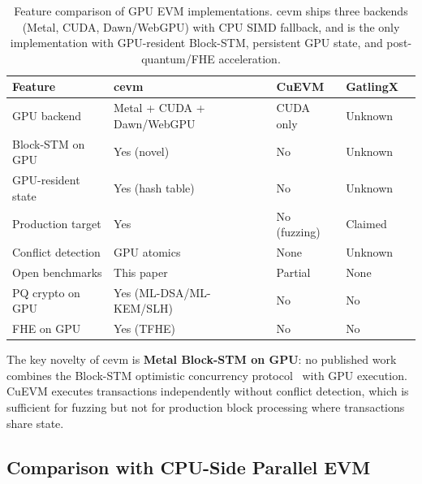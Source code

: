 \begin{table}[h]
\centering
\small
\begin{tabular}{lllll}
\toprule
\textbf{Feature} & \textbf{cevm} & \textbf{CuEVM} & \textbf{GatlingX} \\
\midrule
GPU backend         & Metal + CUDA + Dawn/WebGPU & CUDA only     & Unknown \\
Block-STM on GPU    & Yes (novel)             & No               & Unknown \\
GPU-resident state  & Yes (hash table)        & No               & Unknown \\
Production target   & Yes                     & No (fuzzing)     & Claimed \\
Conflict detection  & GPU atomics             & None             & Unknown \\
Open benchmarks     & This paper              & Partial          & None \\
PQ crypto on GPU    & Yes (ML-DSA/ML-KEM/SLH) & No               & No \\
FHE on GPU          & Yes (TFHE)              & No               & No \\
\bottomrule
\end{tabular}
\caption{Feature comparison of GPU EVM implementations. cevm ships three backends
(Metal, CUDA, Dawn/WebGPU) with CPU SIMD fallback, and is the only implementation
with GPU-resident Block-STM, persistent GPU state, and post-quantum/FHE acceleration.}
\label{tab:gpu_comparison}
\end{table}

The key novelty of cevm is \textbf{Metal Block-STM on GPU}: no published work combines
the Block-STM optimistic concurrency protocol~\cite{blockstm} with GPU execution. CuEVM
executes transactions independently without conflict detection, which is sufficient for
fuzzing but not for production block processing where transactions share state.

\subsection{Comparison with CPU-Side Parallel EVM}

